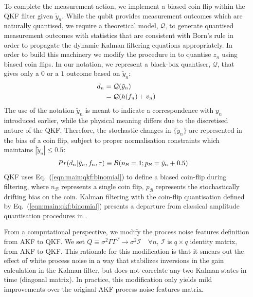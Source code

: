 To complete the measurement action, we implement a biased coin flip within the QKF filter given $\tilde{y}_n$.  While the qubit provides measurement outcomes which are naturally quantised, we require a theoretical model, $\mathcal{Q}$, to generate quantised measurement outcomes with statistics that are consistent with Born's rule in order to propagate the dynamic Kalman filtering equations appropriately. In order to build this machinery we modify the procedure in \cite{karlsson2005} to quantise $z_n$ using biased coin flips. In our notation, we represent a black-box quantiser, $\mathcal{Q}$, that gives only a $0$ or a $1$ outcome based on $\tilde{y}_n$:
\begin{align}
	d_n &= \mathcal{Q}(\tilde{y}_n)\\
	&=  \mathcal{Q}(h(f_n) + v_n)
\end{align}
The use of the notation $\tilde{y}_n$ is meant to indicate a correspondence with $y_{n}$ introduced earlier, while the physical meaning differs due to the discretised nature of the QKF.  Therefore, the stochastic changes in $\{ \tilde{y}_n\}$ are represented in the bias of a coin flip, subject to proper normalisation constraints which maintains $|\tilde{y}_n| \leq 0.5$:
\begin{align}
	Pr(d_n| \tilde{y}_n, f_{n}, \tau) & \equiv \mathcal{B}(n_{\mathcal{B}}=1;p_{\mathcal{B}}= \tilde{y}_n + 0.5 ) \label{eqn:main:qkf:binomial}
\end{align}
QKF uses Eq.~(\ref {eqn:main:qkf:binomial}) to define a biased coin-flip during filtering, where $n_{\mathcal{B}}$ represents a single coin flip, $p_{\mathcal{B}}$ represents the stochastically drifting bias on the coin. Kalman filtering with the coin-flip quantisation defined by Eq.~(\ref {eqn:main:qkf:binomial}) presents a departure from classical amplitude quantisation procedures in \cite{widrow1996, karlsson2005}.

From a computational perspective, we modify the process noise features definition from AKF to QKF. We set $Q \equiv \sigma^2\Gamma \Gamma^T \to \sigma^2 \mathcal{I} \quad \forall n $, $\mathcal{I}$ is $q\times q$ identity matrix, from AKF to QKF. This rationale for this modification is that it smears out the effect of white process noise in a way that stabilizes inversions in the gain calculation in the Kalman filter, but does not correlate any two Kalman states in time (diagonal matrix). In practice, this modification only yields mild improvements over the original AKF process noise features matrix.

